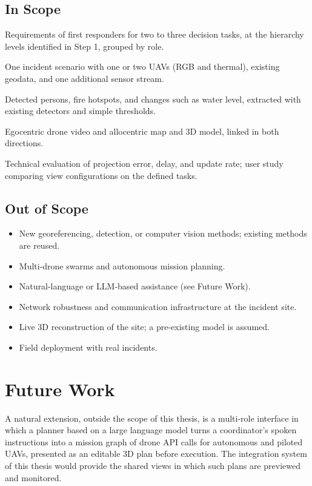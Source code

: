 \documentclass{article}
\begin{document}
\subsection{In Scope}
\begin{description}[style=nextline]
  \item[Requirements] Requirements of first responders for two to three decision tasks, at the hierarchy levels identified in Step 1, grouped by role.
  \item[Set-up] One incident scenario with one or two UAVs (RGB and thermal), existing geodata, and one additional sensor stream.
  \item[Events] Detected persons, fire hotspots, and changes such as water level, extracted with existing detectors and simple thresholds.
  \item[Views] Egocentric drone video and allocentric map and 3D model, linked in both directions.
  \item[Evaluation] Technical evaluation of projection error, delay, and update rate; user study comparing view configurations on the defined tasks.
\end{description}

\subsection{Out of Scope}
\begin{itemize}
  \item New georeferencing, detection, or computer vision methods; existing methods are reused.
  \item Multi-drone swarms and autonomous mission planning.
  \item Natural-language or LLM-based assistance (see Future Work).
  \item Network robustness and communication infrastructure at the incident site.
  \item Live 3D reconstruction of the site; a pre-existing model is assumed.
  \item Field deployment with real incidents.
\end{itemize}

\section{Future Work}
A natural extension, outside the scope of this thesis, is a multi-role interface in which a planner based on a large language model turns a coordinator's spoken instructions into a mission graph of drone API calls for autonomous and piloted UAVs, presented as an editable 3D plan before execution.
The integration system of this thesis would provide the shared views in which such plans are previewed and monitored.

\newpage


\end{document}
